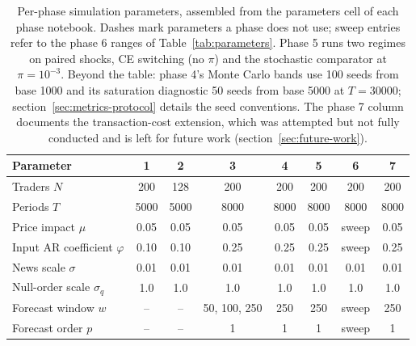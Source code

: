 \documentclass[12pt]{article}
\begin{document}
\begin{table}[h]
\centering
\caption{Per-phase simulation parameters, assembled from the parameters cell of each phase notebook. Dashes mark parameters a phase does not use; sweep entries refer to the phase 6 ranges of Table~\ref{tab:parameters}. Phase 5 runs two regimes on paired shocks, CE switching (no $\pi$) and the stochastic comparator at $\pi = 10^{-3}$. Beyond the table: phase 4's Monte Carlo bands use 100 seeds from base 1000 and its saturation diagnostic 50 seeds from base 5000 at $T = 30000$; section~\ref{sec:metrics-protocol} details the seed conventions. The phase 7 column documents the transaction-cost extension, which was attempted but not fully conducted and is left for future work (section~\ref{sec:future-work}).} %
\label{tab:phase-parameters}
\scriptsize
\setlength{\tabcolsep}{3pt}
\begin{tabular}{@{}l c c c c c c c@{}}
\toprule
Parameter & 1 & 2 & 3 & 4 & 5 & 6 & 7 \\
\midrule
Traders $N$ & 200 & 128 & 200 & 200 & 200 & 200 & 200 \\ %
Periods $T$ & 5000 & 5000 & 8000 & 8000 & 8000 & 8000 & 8000 \\ %
Price impact $\mu$ & 0.05 & 0.05 & 0.05 & 0.05 & 0.05 & sweep & 0.05 \\ %
Input AR coefficient $\varphi$ & 0.10 & 0.10 & 0.25 & 0.25 & 0.25 & sweep & 0.25 \\ %
News scale $\sigma$ & 0.01 & 0.01 & 0.01 & 0.01 & 0.01 & 0.01 & 0.01 \\ %
Null-order scale $\sigma_q$ & 1.0 & 1.0 & 1.0 & 1.0 & 1.0 & 1.0 & 1.0 \\ %
Forecast window $w$ & -- & -- & 50, 100, 250 & 250 & 250 & sweep & 250 \\ %
Forecast order $p$ & -- & -- & 1 & 1 & 1 & sweep & 1 \\ %

\end{tabular}
\end{table}
\end{document}
